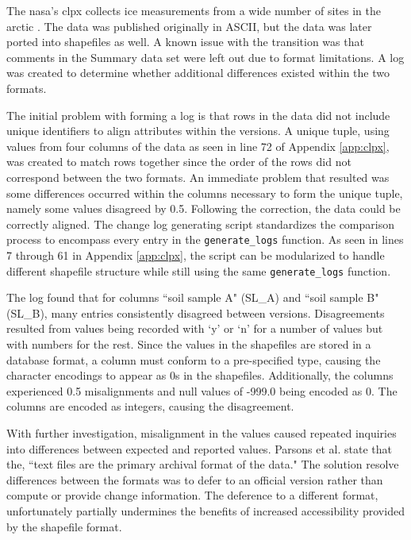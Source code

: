 The \gls{nasa}'s \gls{clpx} collects ice measurements from a wide number of sites in the arctic \cite{CLPX}.
The data was published originally in ASCII, but the data was later ported into shapefiles as well.
A known issue with the transition was that comments in the Summary data set were left out due to format limitations.
A \gls{log} was created to determine whether additional differences existed within the two formats.

The initial problem with forming a \gls{log} is that rows in the data did not include unique identifiers to align \glspl{attribute} within the \glspl{version}.
A unique tuple, using values from four columns of the data as seen in line 72 of Appendix \ref{app:clpx}, was created to match rows together since the order of the rows did not correspond between the two formats.
An immediate problem that resulted was some differences occurred within the columns necessary to form the unique tuple, namely some values disagreed by 0.5.
Following the correction, the data could be correctly aligned.
The change log generating script standardizes the comparison process to encompass every entry in the \texttt{generate_logs} function.
As seen in lines 7 through 61 in Appendix \ref{app:clpx}, the script can be modularized to handle different shapefile structure while still using the same \texttt{generate_logs} function.

The \gls{log} found that for columns ``soil sample A" (SL\_A) and ``soil sample B" (SL\_B), many entries consistently disagreed between \glspl{version}.
Disagreements resulted from values being recorded with `y' or `n' for a number of values but with numbers for the rest.
Since the values in the shapefiles are stored in a database format, a column must conform to a pre-specified type, causing the character encodings to appear as 0s in the shapefiles.
Additionally, the columns experienced 0.5 misalignments and null values of -999.0 being encoded as 0.
The columns are encoded as integers, causing the disagreement.

With further investigation, misalignment in the values caused repeated inquiries into differences between expected and reported values.
Parsons et al. \cite{CLPX2} state that the, ``text files are the primary archival format of the data."
The solution resolve differences between the formats was to defer to an official version rather than compute or provide change information.
The deference to a different format, unfortunately partially undermines the benefits of increased accessibility provided by the shapefile format.

